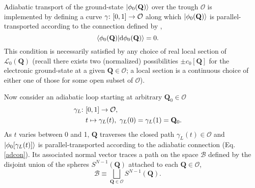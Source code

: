 \documentclass[superscriptaddress,showpacs,amsmath,amssymb,pra,twocolumn]{revtex4-1}
\begin{document}
Adiabatic transport of the ground-state $\ket{\phi_{0}(\mathbf{Q})}$
over the trough $\mathcal{O}$ is implemented by defining a curve
$\text{\ensuremath{\gamma}:}~[0,1]\rightarrow\mathcal{O}$ along which
$\ket{\phi_{0}(\mathbf{Q})}$ is parallel-transported according to
the connection defined by \cite{berry_quantal_1984,ceulemans_berry_1991,bohm2003geometric},
\begin{equation}
\braket{\phi_{0}(\mathbf{Q})|\mathrm{d}\phi_{0}(\mathbf{Q})}=0.\label{adcon}
\end{equation}
This condition is necessarily satisfied by any choice of real local
section of $\mathcal{L}_{0}(\mathbf{Q})$ (recall there exists two (normalized)
possibilities $\pm c_{0}[\mathbf{Q}]$ for the electronic ground-state
at a given $\mathbf{Q}\in\mathcal{O}$; a local section is a continuous choice
of either one of those for some open subset of $\mathcal{O}$). 

Now consider an adiabatic loop starting at arbitrary $\mathbf{Q}_{0}\in\mathcal{O}$
\begin{align}
\text{\ensuremath{\gamma_{L}}:}~ & [0,1]\rightarrow\mathcal{O},\nonumber \\
 & t\mapsto\gamma_{L}(t),~\gamma_{L}(0)=\gamma_{L}(1)=\mathbf{Q}_{0}.
\end{align}
As $t$ varies between 0 and 1, $\mathbf{Q}$ traverses the closed
path $\gamma_{L}(t)\in\mathcal{O}$ and $\ket{\phi_{0}[\gamma_{L}(t)]}$
is parallel-transported according to the adiabatic connection (Eq. \ref{adcon}). Its
associated normal vector traces a path on the space $\mathcal{B}$
defined by the disjoint union of the spheres $S^{N-1}(\mathbf{Q})$
attached to each $\mathbf{Q}\in\mathcal{O}$, 
\begin{equation}
\mathcal{B}\equiv\bigsqcup_{\mathbf{Q}\in\mathcal{O}}S^{N-1}(\mathbf{Q}).\label{bundle}
\end{equation}
\end{document}
